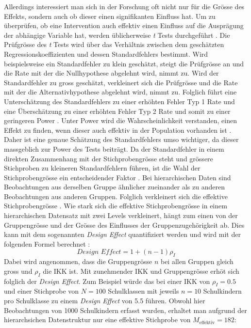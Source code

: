 \documentclass[12pt]{article}\usepackage[]{graphicx}\usepackage[]{color}
\begin{document}
Allerdings interessiert man sich in der Forschung oft nicht nur für die Grösse des Effekts, sondern auch ob dieser einen signifikanten Einfluss hat. Um zu überprüfen, ob eine Intervention auch effektiv einen Einfluss auf die Ausprägung der abhängige Variable hat, werden üblicherweise \textit{t} Tests durchgeführt \citep{SnijdersTomA.B2012Ma:a}. Die Prüfgrösse des \textit{t} Tests wird über das Verhältnis zwischen dem geschätzten Regressionskoeffizienten und dessen Standardfehlers bestimmt. Wird beispielsweise ein Standardfehler zu klein geschätzt, steigt die Prüfgrösse an und die Rate mit der die Nullhypothese abgelehnt wird, nimmt zu. Wird der Standardfehler zu gross geschätzt, verkleinert sich die Prüfgrösse und die Rate mit der die Alternativhypothese abgelehnt wird, nimmt zu. Folglich führt eine Unterschätzung des Standardfehlers zu einer erhöhten Fehler Typ 1 Rate und eine Überschätzung zu einer erhöhten Fehler Typ 2 Rate und somit zu einer geringeren Power \citep{SnijdersTomA.B2012Ma:a}. Unter Power wird die Wahrscheinlichkeit verstanden, einen Effekt zu finden, wenn dieser auch effektiv in der Population vorhanden ist \citep{scherbaumferreter2009powersample}. Daher ist eine genaue Schätzung des Standardfehlers umso wichtiger, da dieser massgeblich zur Power des Tests beiträgt. Da der Standardfehler in einem direkten Zusammenhang mit der Stichprobengrösse steht und grössere Stichproben zu kleineren Standardfehlern führen, ist die Wahl der Stichprobengrösse ein entscheidender Faktor \citep{james2013introduction, SnijdersTomA.B2012Ma:a}. Bei hierarchischen Daten sind Beobachtungen aus derselben Gruppe ähnlicher zueinander als zu anderen Beobachtungen aus anderen Gruppen. Folglich verkleinert sich die effektive Stichprobengrösse \citep{raudenbush2002hierarchical}. Wie stark sich die effektive Stichprobengrösse in einem hierarchischen Datensatz mit zwei Levels verkleinert, hängt zum einen von der Gruppengrösse und der Grösse des Einflusses der Gruppenzugehörigkeit ab. Dies kann mit dem sogenannten \textit{Design Effect} quantifiziert werden und wird mit der folgenden Formel berechnet \citep{raudenbush2002hierarchical,SnijdersTomA.B2012Ma:a}:
\begin{equation}
\textit{Design Effect} = 1 + (n - 1) \rho_I
\end{equation}
Dabei wird angenommen, dass die Gruppengrösse $n$ bei allen Gruppen gleich gross und $\rho_I$ die IKK ist. Mit zunehmender IKK und Gruppengrösse erhöt sich folglich der \textit{Design Effect}. Zum Beispiel würde das bei einer IKK von $\rho_I = 0.5$ und einer Stichprobe von $N = 100$ Schulklassen mit jeweils $n = 10$ Schulkindern pro Schulklasse zu einem \textit{Design Effect} von 5.5 führen. Obwohl hier Beobachtungen von 1000 Schulkindern erfasst wurden, erhaltet man aufgrund der hierarchsichen Datenstruktur nur eine effektive Stichprobe von $M_{\text{effektiv}} = 182$:
\end{document}
